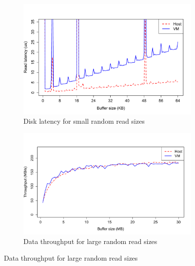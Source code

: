 \begin{figure}[t]
	\begin{subfigure}{0.5\textwidth}
	\includegraphics[width=\textwidth]{./figures/p1_new.pdf}
	\caption{Disk latency for small random read sizes}
	\label{fig:p1block}
	\end{subfigure}

	\begin{subfigure}{0.5\textwidth}
	\includegraphics[width=\textwidth]{./figures/p1_old.pdf}
	\caption{Data throughput for large random read sizes}
	\label{fig:p1graph}
	\end{subfigure}
\end{figure}

